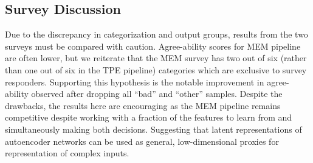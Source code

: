 \documentclass[runningheads,a4paper]{llncs}
\begin{document}
\subsection{Survey Discussion}
\label{survey2_takeaway}
Due to the discrepancy in categorization and output groups, results from the two surveys must be compared with caution. Agree-ability scores for MEM pipeline are often lower, but we reiterate that the MEM survey has two out of six (rather than one out of six in the TPE pipeline) categories which are exclusive to survey responders. Supporting this hypothesis is the notable improvement in agree-ability observed after dropping all \enquote{bad} and \enquote{other} samples. Despite the drawbacks, the results here are encouraging as the MEM pipeline remains competitive despite working with a fraction of the features to learn from and simultaneously making both decisions. Suggesting that latent representations of autoencoder networks can be used as general, low-dimensional proxies for representation of complex inputs.  
\end{document}
